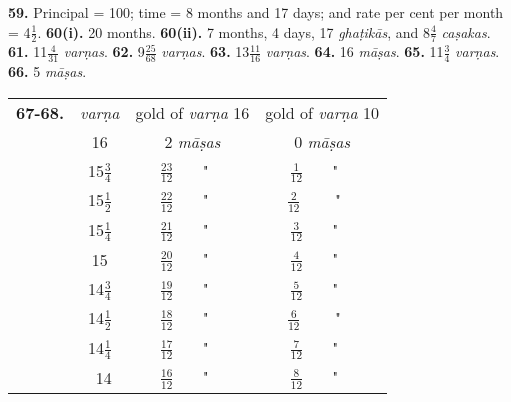\documentclass[10pt, openany]{book}
\begin{document}
{{{{{{{{{{{{{{{{{{{{\begin{sloppypar}
\textbf{59.} Principal = 100; time = 8 months and 17 days; and rate per cent per month = 4$\frac{1}{2}$. \textbf{60(i).} 20 months. \textbf{60(ii).} 7 months, 4 days, 17  \textit{ghaṭikās}, and 8$\frac{4}{7}$ \textit{caṣakas}. \textbf{61.} 11$\frac{4}{31}$ \textit{varṇas}. \textbf{62.} 9$\frac{25}{68}$ \textit{varṇas}. \textbf{63.} 13$\frac{11}{16}$ \textit{varṇas}. \textbf{64.} 16 \textit{māṣas}. \textbf{65.} 11$\frac{3}{4}$ \textit{varṇas}. \textbf{66.} 5  \textit{māṣas}.
\end{sloppypar}

\renewcommand*{\arraystretch}{1.3}
\begin{center}
\begin{tabular}{cccc}
\textbf{67-68.} & \textit{varṇa} & gold of \textit{varṇa} 16 & gold of \textit{varṇa} 10\\
     & 16 & 2  \textit{māṣas} & 0  \textit{māṣas} \\
     & 15$\frac{3}{4}$ & $\frac{23}{12}$~~~ "~~ & $\frac{1}{12}$~~~ "~~\\
     & 15$\frac{1}{2}$ & $\frac{22}{12}$~~~ "~~ & $\frac{2}{12}$ ~~~ "~~\\
     & 15$\frac{1}{4}$ & $\frac{21}{12}$~~~ "~~ & $\frac{3}{12}$~~~ "~~\\
     & 15 & $\frac{20}{12}$~~~ "~~ & $\frac{4}{12}$~~~ "~~ \\
	 & 14$\frac{3}{4}$ & $\frac{19}{12}$~~~ "~~ & $\frac{5}{12}$~~~ "~~\\
     & 14$\frac{1}{2}$ & $\frac{18}{12}$~~~ "~~ & $\frac{6}{12}$ ~~~ "~~\\
     & 14$\frac{1}{4}$ & $\frac{17}{12}$~~~ "~~ & $\frac{7}{12}$~~~ "~~\\
     & ~14 & $\frac{16}{12}$~~~ "~~ & $\frac{8}{12}$~~~ "~~ \\
\end{tabular}
\end{center}


\newpage

}}}}}}}}}}}}}}}}}}}}
\end{document}
